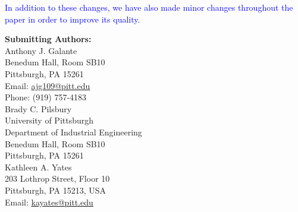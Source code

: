 \documentclass[12pt]{letter}
\newcommand{\blue}[1]{\textcolor{blue}{#1}} %
\begin{document}
\begin{enumerate}




\end{enumerate}



\blue{In addition to these changes, we have also made minor changes throughout the paper in order to improve its quality.}



\newpage


\textbf{Submitting Authors:}\\
Anthony J. Galante\\
Benedum Hall, Room SB10 \\
Pittsburgh, PA 15261\\
Email:  \href{mailto:ajg109@pitt.edu}{ajg109@pitt.edu}\\
Phone: (919) 757-4183\\

Brady C. Pilsbury \\
University of Pittsburgh \\
Department of Industrial Engineering \\
Benedum Hall, Room SB10 \\
Pittsburgh, PA 15261\\

Kathleen A. Yates\\
 203 Lothrop Street, Floor 10\\
Pittsburgh, PA 15213, USA\\
Email:  \href{mailto:kayates@pitt.edu}{kayates@pitt.edu}\\
\end{document}
